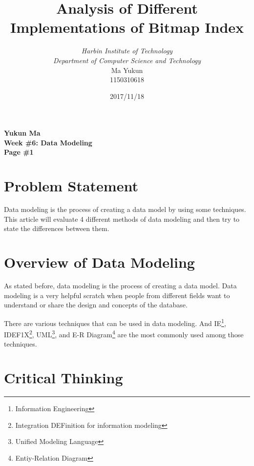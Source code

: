 \documentclass[12pt, a4paper]{article}
\begin{document}
\title{{\bf\Huge Analysis of Different Implementations of Bitmap Index}}
\author{\emph{Harbin Institute of Technology}\\\emph{Department of Computer Science and Technology}\\Ma Yukun\\1150310618}

\date{2017/11/18}

\nocite{*}


\begin{center}
{\textbf{
Yukun Ma\\
Week \#6: Data Modeling\\
Page \#1}}
\end{center}

\section{Problem Statement}


Data modeling is the process of creating a data model by using some techniques.\cite{wiki}
This article will evaluate 4 different methods of data modeling and then try to state the differences between them.




\section{Overview of Data Modeling}

As stated before, data modeling is the process of creating a data model. Data modeling is a very helpful scratch when people from different fields want to understand or share the design and concepts of the database.

There are various techniques that can be used in data modeling. And IE\footnote{Information Engineering}, IDEF1X\footnote{Integration DEFinition for information modeling}, UML\footnote{Unified Modeling Language}, and E-R Diagram\footnote{Entiy-Relation Diagram} are the most commonly used among those techniques.


\section{Critical Thinking}
\end{document}
